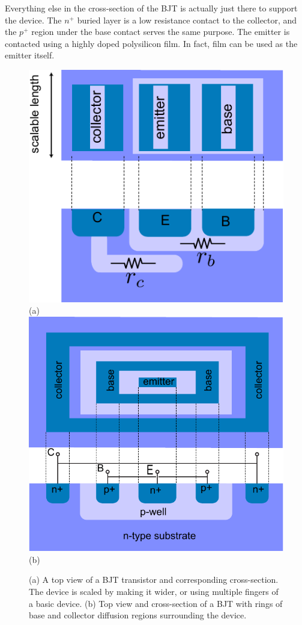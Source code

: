 Everything else in the cross-section of the BJT is actually just there to support the device.  The $n^+$ buried layer is a low resistance contact to the collector, and the $p^+$ region under the base contact serves the same purpose.  The emitter is contacted using a highly doped polysilicon film. In fact, film can be used as the emitter itself.
\begin{figure}[t]
\centering
\includegraphics[width=.45\columnwidth]{slide4_bjt_layout}\\
(a)\\[0.25cm]
\includegraphics[width=.45\columnwidth]{bjt_npn_round}\\
(b)
\caption{(a) A top view of a BJT transistor and corresponding cross-section.  The device is scaled by making it wider, or using multiple fingers of a basic device.  (b) Top view and cross-section of a BJT with rings of base and collector diffusion regions surrounding the device.} 
\label{fig:bjt_top}
\end{figure}
